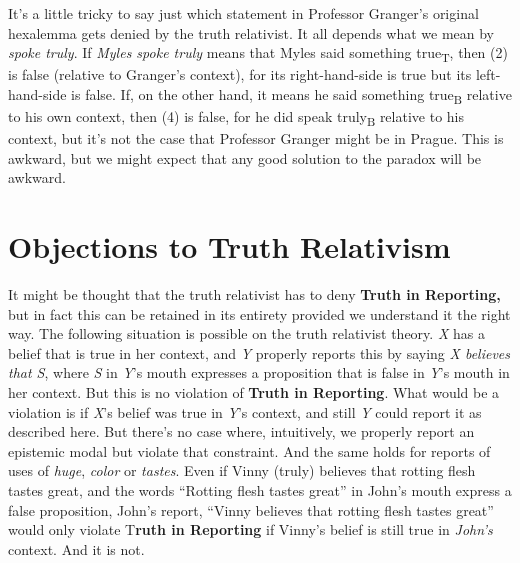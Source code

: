 \documentclass[
  11pt,
  letterpaper,
  DIV=11,
  numbers=noendperiod]{scrartcl}
\begin{document}
It's a little tricky to say just which statement in Professor Granger's
original hexalemma gets denied by the truth relativist. It all depends
what we mean by \emph{spoke truly}. If \emph{Myles spoke truly} means
that Myles said something true\textsubscript{T}, then (2) is false
(relative to Granger's context), for its right-hand-side is true but its
left-hand-side is false. If, on the other hand, it means he said
something true\textsubscript{B} relative to his own context, then (4) is
false, for he did speak truly\textsubscript{B} relative to his context,
but it's not the case that Professor Granger might be in Prague. This is
awkward, but we might expect that any good solution to the paradox will
be awkward.

\section{Objections to Truth
Relativism}\label{objections-to-truth-relativism}

It might be thought that the truth relativist has to deny \textbf{Truth
in Reporting,} but in fact this can be retained in its entirety provided
we understand it the right way. The following situation is possible on
the truth relativist theory. \emph{X} has a belief that is true in her
context, and \emph{Y} properly reports this by saying \emph{X believes
that S}, where \emph{S} in \emph{Y}'s mouth expresses a proposition that
is false in \emph{Y}'s mouth in her context. But this is no violation of
\textbf{Truth in Reporting}. What would be a violation is if \emph{X}'s
belief was true in \emph{Y}'s context, and still \emph{Y} could report
it as described here. But there's no case where, intuitively, we
properly report an epistemic modal but violate that constraint. And the
same holds for reports of uses of \emph{huge}, \emph{color} or
\emph{tastes}. Even if Vinny (truly) believes that rotting flesh tastes
great, and the words ``Rotting flesh tastes great'' in John's mouth
express a false proposition, John's report, ``Vinny believes that
rotting flesh tastes great'' would only violate T\textbf{ruth in
Reporting} if Vinny's belief is still true in \emph{John's} context. And
it is not.
\end{document}
